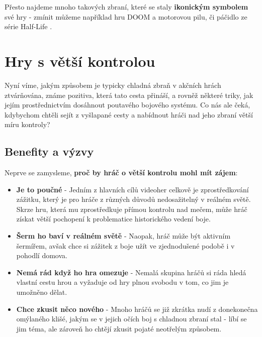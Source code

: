 Přesto najdeme mnoho takových zbraní, které se staly \textbf{ikonickým symbolem} své hry - zmínit můžeme například hru DOOM \cite{DOOM1993} a motorovou pilu, či páčidlo ze série Half-Life \cite{HalfLife}.





\section{Hry s větší kontrolou}

Nyní víme, jakým způsobem je typicky chladná zbraň v akčních hrách ztvárňována, známe pozitiva, která tato cesta přináší, a rovněž některé triky, jak jejím prostřednictvím dosáhnout poutavého bojového systému. Co nás ale čeká, kdybychom chtěli sejít z vyšlapané cesty a nabídnout hráči nad jeho zbraní větší míru kontroly?

\subsection{Benefity a výzvy}

Neprve se zamysleme, \textbf{proč by hráč o větší kontrolu mohl mít zájem}:
\begin{itemize}
    \item \textbf{Je to poučné} - Jedním z hlavních cílů videoher celkově je zprostředkování zážitku, který je pro hráče z různých důvodů nedosažitelný v reálném světě. Skrze hru, která mu zprostředkuje přímou kontrolu nad mečem, může hráč získat větší pochopení k problematice historického vedení boje.
    \item \textbf{Šerm ho baví v reálném světě} - Naopak, hráč může být aktivním šermířem, avšak chce si zážitek z boje užít ve zjednodušené podobě i v pohodlí domova.
    \item \textbf{Nemá rád když ho hra omezuje} - Nemalá skupina hráčů si ráda hledá vlastní cestu hrou a vyžaduje od hry plnou svobodu v tom, co jim je umožněno dělat. 
    \item \textbf{Chce zkusit něco nového} - Mnoho hráčů se již zkrátka nudí z donekonečna omýlaného klišé, jakým se v jejich očích boj s chladnou zbraní stal - líbí se jim téma, ale zároveň ho chtějí zkusit pojaté neotřelým způsobem.
\end{itemize}

